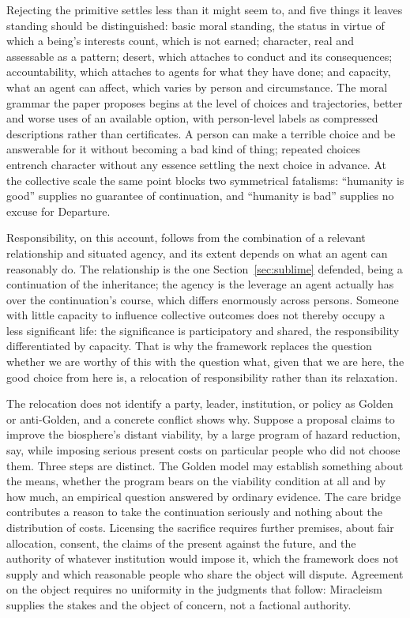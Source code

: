 Rejecting the primitive settles less than it might seem to, and five things it
leaves standing should be distinguished: basic moral standing, the status in
virtue of which a being's interests count, which is not earned; character,
real and assessable as a pattern; desert, which attaches to conduct and its
consequences; accountability, which attaches to agents for what they have
done; and capacity, what an agent can affect, which varies by person and
circumstance. The moral grammar the paper proposes begins at the level of
choices and trajectories, better and worse uses of an available option, with
person-level labels as compressed descriptions rather than certificates. A
person can make a terrible choice and be answerable for it without becoming a
bad kind of thing; repeated choices entrench character without any essence
settling the next choice in advance. At the collective scale the same point blocks two symmetrical
fatalisms: ``humanity is good'' supplies no guarantee of continuation, and
``humanity is bad'' supplies no excuse for Departure.

Responsibility, on this account, follows from the combination of a relevant
relationship and situated agency, and its extent depends on what an agent can
reasonably do. The relationship is the one Section~\ref{sec:sublime} defended,
being a continuation of the inheritance; the agency is the leverage an agent
actually has over the continuation's course, which differs enormously across
persons. Someone with little capacity to influence collective outcomes does
not thereby occupy a less significant life: the significance is participatory
and shared, the responsibility differentiated by capacity. That is why the
framework replaces the question whether we are worthy of this with the
question what, given that we are here, the good choice from here is, a
relocation of responsibility rather than its relaxation.

The relocation does not identify a party, leader, institution, or policy as
Golden or anti-Golden, and a concrete conflict shows why. Suppose a proposal
claims to improve the biosphere's distant viability, by a large program of
hazard reduction, say, while imposing serious present costs on particular
people who did not choose them. Three steps are distinct. The Golden model may
establish something about the means, whether the program bears on the
viability condition at all and by how much, an empirical question answered by
ordinary evidence. The care bridge contributes a reason to take the
continuation seriously and nothing about the distribution of costs. Licensing
the sacrifice requires further premises, about fair allocation, consent, the
claims of the present against the future, and the authority of whatever
institution would impose it, which the framework does not supply and which
reasonable people who share the object will dispute. Agreement on the object
requires no uniformity in the judgments that follow: Miracleism supplies the
stakes and the object of concern, not a factional authority.

